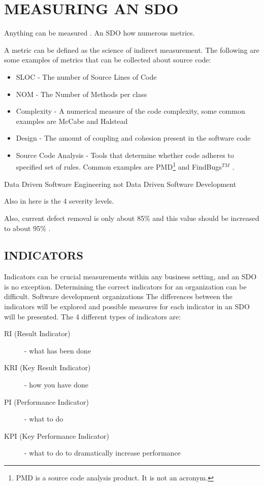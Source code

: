 \documentclass[SDSUThesis.tex]{subfiles}
\begin{document}
\section{MEASURING AN SDO}

Anything can be measured \cite{Hubbard2010}.  An SDO
how numerous metrics.

A metric can be defined as the science of indirect measurement.
    The following are some examples of metrics that can be collected 
    about source code:
    \begin{itemize}
        \item SLOC - The number of Source Lines of Code 
        \item NOM - The Number of Methods per class
        \item Complexity - A numerical measure of the code complexity,
            some common examples are McCabe \cite{McCabe1976} and 
            Halstead \cite{Halstead1977}
        \item Design - The amount of coupling and cohesion present 
        in the software code
        \item Source Code Analysis - Tools that determine whether 
        code adheres to specified set of rules. Common 
        examples are PMD\footnote{PMD is a source code analysis product.  It is not an acronym.} and FindBugs$^{TM}$ \cite{PMD, Findbugs}.
    \end{itemize}

Data Driven Software Engineering not Data Driven Software Development

Also in here is the 4 severity levels.  

        Also, current defect removal is only about 85\% and this value should be increased to about 95\% \cite{Jones2009}. 


\subsection{INDICATORS}
Indicators can be crucial measurements
within any business setting, and an SDO is no exception. Determining
the correct indicators for an organization can
be difficult.  Software development organizations
The differences between the indicators will be explored and
possible measures for each indicator in an SDO will be
presented.  The 4 different types of indicators are:
\begin{description}
  \item[RI (Result Indicator)] - what has been done
  \item[KRI (Key Result Indicator)] - how you have done
  \item[PI (Performance Indicator)] - what to do
  \item[KPI (Key Performance Indicator)] - what to do to dramatically increase performance
\end{description}
\end{document}
